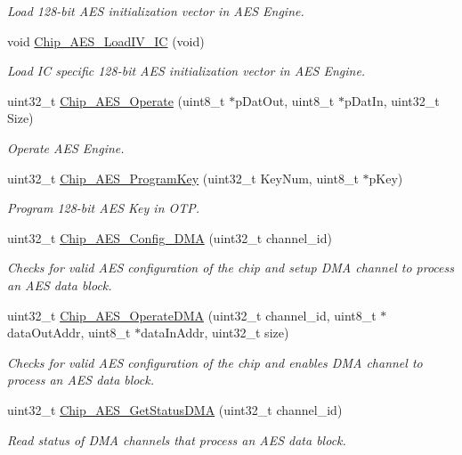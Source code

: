 \begin{DoxyCompactItemize}
\begin{DoxyCompactList}\small\item\em Load 128-\/bit A\+ES initialization vector in A\+ES Engine. \end{DoxyCompactList}\item 
void \hyperlink{group___a_e_s__18_x_x__43_x_x_ga28b082ffabc8a8346b4490757899ab49}{Chip\+\_\+\+A\+E\+S\+\_\+\+Load\+I\+V\+\_\+\+IC} (void)
\begin{DoxyCompactList}\small\item\em Load IC specific 128-\/bit A\+ES initialization vector in A\+ES Engine. \end{DoxyCompactList}\item 
uint32\+\_\+t \hyperlink{group___a_e_s__18_x_x__43_x_x_ga332c304d0fe1a3a0eb15529fe95dc0bb}{Chip\+\_\+\+A\+E\+S\+\_\+\+Operate} (uint8\+\_\+t $\ast$p\+Dat\+Out, uint8\+\_\+t $\ast$p\+Dat\+In, uint32\+\_\+t Size)
\begin{DoxyCompactList}\small\item\em Operate A\+ES Engine. \end{DoxyCompactList}\item 
uint32\+\_\+t \hyperlink{group___a_e_s__18_x_x__43_x_x_gae8e51b0b68f782ac19e8d4157f666fc2}{Chip\+\_\+\+A\+E\+S\+\_\+\+Program\+Key} (uint32\+\_\+t Key\+Num, uint8\+\_\+t $\ast$p\+Key)
\begin{DoxyCompactList}\small\item\em Program 128-\/bit A\+ES Key in O\+TP. \end{DoxyCompactList}\item 
uint32\+\_\+t \hyperlink{group___a_e_s__18_x_x__43_x_x_gaee31f907e01cfaa8448d215aa9920e9f}{Chip\+\_\+\+A\+E\+S\+\_\+\+Config\+\_\+\+D\+MA} (uint32\+\_\+t channel\+\_\+id)
\begin{DoxyCompactList}\small\item\em Checks for valid A\+ES configuration of the chip and setup D\+MA channel to process an A\+ES data block. \end{DoxyCompactList}\item 
uint32\+\_\+t \hyperlink{group___a_e_s__18_x_x__43_x_x_ga47b80d4262083a8d9ebdaf8bce58b9c9}{Chip\+\_\+\+A\+E\+S\+\_\+\+Operate\+D\+MA} (uint32\+\_\+t channel\+\_\+id, uint8\+\_\+t $\ast$data\+Out\+Addr, uint8\+\_\+t $\ast$data\+In\+Addr, uint32\+\_\+t size)
\begin{DoxyCompactList}\small\item\em Checks for valid A\+ES configuration of the chip and enables D\+MA channel to process an A\+ES data block. \end{DoxyCompactList}\item 
uint32\+\_\+t \hyperlink{group___a_e_s__18_x_x__43_x_x_gabc7a95a818dfe7de0ffd09a40a63ffb2}{Chip\+\_\+\+A\+E\+S\+\_\+\+Get\+Status\+D\+MA} (uint32\+\_\+t channel\+\_\+id)
\begin{DoxyCompactList}\small\item\em Read status of D\+MA channels that process an A\+ES data block. \end{DoxyCompactList}\end{DoxyCompactItemize}


